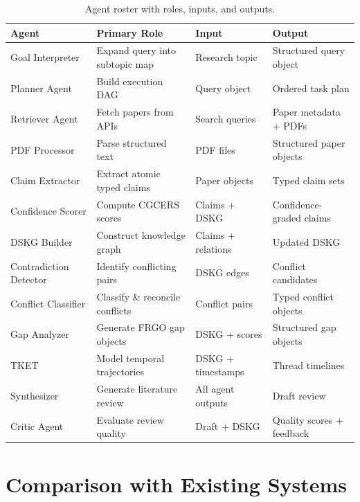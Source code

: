 \documentclass{llncs}
\begin{document}
\begin{table}[htbp]
\centering
\caption{Agent roster with roles, inputs, and outputs.}
\label{tab:agents}
\begin{tabular}{p{2.5cm}p{3cm}p{2cm}p{2.5cm}}
\toprule
\textbf{Agent} & \textbf{Primary Role} & \textbf{Input} & \textbf{Output} \\
\midrule
Goal Interpreter  & Expand query into subtopic map   & Research topic          & Structured query object \\
Planner Agent     & Build execution DAG              & Query object            & Ordered task plan       \\
Retriever Agent   & Fetch papers from APIs           & Search queries          & Paper metadata + PDFs   \\
PDF Processor     & Parse structured text            & PDF files               & Structured paper objects \\
Claim Extractor   & Extract atomic typed claims      & Paper objects           & Typed claim sets        \\
Confidence Scorer & Compute CGCERS scores            & Claims + DSKG           & Confidence-graded claims \\
DSKG Builder      & Construct knowledge graph        & Claims + relations      & Updated DSKG            \\
Contradiction Detector & Identify conflicting pairs  & DSKG edges              & Conflict candidates     \\
Conflict Classifier & Classify \& reconcile conflicts & Conflict pairs         & Typed conflict objects  \\
Gap Analyzer      & Generate FRGO gap objects        & DSKG + scores           & Structured gap objects  \\
TKET              & Model temporal trajectories      & DSKG + timestamps       & Thread timelines        \\
Synthesizer       & Generate literature review       & All agent outputs       & Draft review            \\
Critic Agent      & Evaluate review quality          & Draft + DSKG            & Quality scores + feedback \\
\bottomrule
\end{tabular}
\end{table}

\section{Comparison with Existing Systems}
\label{sec:comparison}
\end{document}
